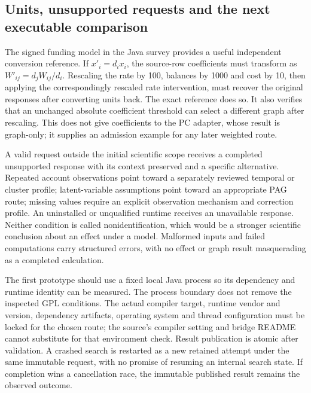 \hypertarget{units-unsupported-requests-and-the-next-executable-comparison}{%
\subsection{Units, unsupported requests and the next executable
comparison}\label{units-unsupported-requests-and-the-next-executable-comparison}}

The signed funding model in the Java survey provides a useful
independent conversion reference. If \(x'_i=d_i x_i\), the source-row
coefficients must transform as \(W'_{ij}=d_jW_{ij}/d_i\). Rescaling the
rate by 100, balances by 1000 and cost by 10, then applying the
correspondingly rescaled rate intervention, must recover the original
responses after converting units back. The exact reference does so. It
also verifies that an unchanged absolute coefficient threshold can
select a different graph after rescaling. This does not give
coefficients to the PC adapter, whose result is graph-only; it supplies
an admission example for any later weighted route.
\citep{exec13_java_adapter_oracles,exec13_java_examples}

A valid request outside the initial scientific scope receives a
completed unsupported response with its context preserved and a specific
alternative. Repeated account observations point toward a separately
reviewed temporal or cluster profile; latent-variable assumptions point
toward an appropriate PAG route; missing values require an explicit
observation mechanism and correction profile. An uninstalled or
unqualified runtime receives an unavailable response. Neither condition
is called nonidentification, which would be a stronger scientific
conclusion about an effect under a model. Malformed inputs and failed
computations carry structured errors, with no effect or graph result
masquerading as a completed calculation.
\citep{exec13_java_adapter_contract}

The first prototype should use a fixed local Java process so its
dependency and runtime identity can be measured. The process boundary
does not remove the inspected GPL conditions. The actual compiler
target, runtime vendor and version, dependency artifacts, operating
system and thread configuration must be locked for the chosen route; the
source's compiler setting and bridge README cannot substitute for that
environment check. Result publication is atomic after validation. A
crashed search is restarted as a new retained attempt under the same
immutable request, with no promise of resuming an internal search state.
If completion wins a cancellation race, the immutable published result
remains the observed outcome.
\citep{exec13_java_tetrad,exec13_java_adapter_contract}

